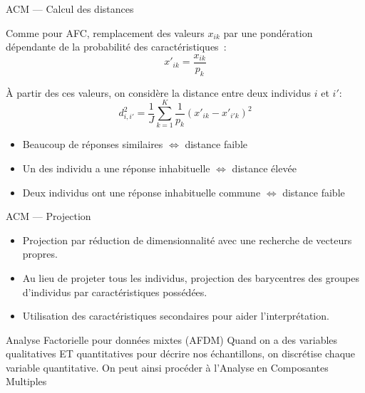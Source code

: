 \begin{frame}{ACM --- Calcul des distances}

  Comme pour AFC, remplacement des valeurs $x_{ik}$ par une pondération dépendante de la probabilité des caractéristiques~:
  \begin{equation*}
    x'_{ik}=\frac{x_{ik}}{p_k}
  \end{equation*}

  À partir des ces valeurs, on considère la distance entre deux individus $i$ et $i'$:
  \begin{equation*}
    d_{i,i'}^2=\frac{1}{J}\sum^K_{k=1} \frac{1}{p_k}(x'_{ik}-x'_{i'k})^2
  \end{equation*}

  \begin{itemize}
    \item Beaucoup de réponses similaires $\Leftrightarrow$ distance faible
    \item Un des individu a une réponse inhabituelle $\Leftrightarrow$ distance élevée
    \item Deux individus ont une réponse inhabituelle commune $\Leftrightarrow$ distance faible
  \end{itemize}
\end{frame}

\begin{frame}{ACM --- Projection}
  \begin{itemize}
    \item Projection par réduction de dimensionnalité avec une recherche de vecteurs propres. 
    \item Au lieu de projeter tous les individus, projection des barycentres des groupes d'individus par caractéristiques possédées. 
    \item Utilisation des caractéristiques secondaires pour aider l'interprétation.
  \end{itemize}
  
  

\end{frame}

\begin{frame}{Analyse Factorielle pour données mixtes (AFDM)}
  Quand on a des variables qualitatives ET quantitatives pour décrire nos échantillons, on discrétise chaque variable quantitative. On peut ainsi procéder à l'Analyse en Composantes Multiples
\end{frame}

